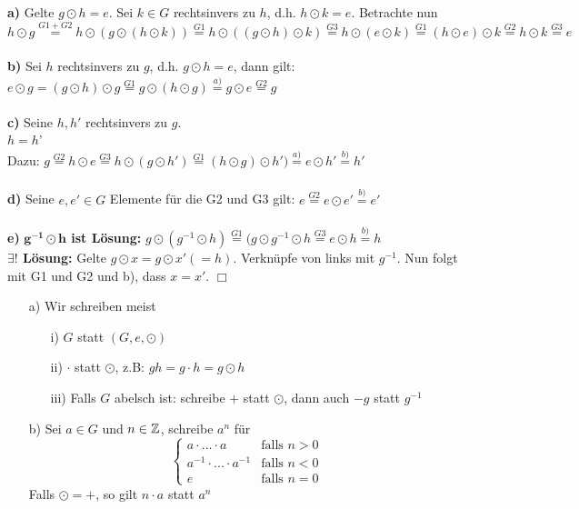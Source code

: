 \begin{bew}
	\textbf{a)} Gelte $g\odot h=e$. Sei $k\in G$ rechtsinvers zu $h$, d.h. $h\odot k=e$. Betrachte nun\\
	$h\odot g\stackrel{G1+G2}{=} h\odot(g\odot(h\odot k))\stackrel{G1}{=} h\odot((g\odot h)\odot k) \stackrel{G3}{=} h\odot(e\odot k)\stackrel{G1}{=} (h\odot e)\odot k\stackrel{G2}{=} h\odot k\stackrel{G3}{=} e$\\
	\\
	\textbf{b)} Sei $h$ rechtsinvers zu $g$, d.h. $g\odot h=e$, dann gilt: $e\odot g=(g\odot h)\odot g\stackrel{G1}{=} g\odot(h\odot g)\stackrel{a)}{=} g\odot e\stackrel{G2}{=} g$\\
	\\
	\textbf{c)} Seine $h,h'$ rechtsinvers zu $g$. \\
	\zz $h=h$'\\
	Dazu: $g\stackrel{G2}{=} h\odot e\stackrel{G3}{=} h\odot(g\odot h')\stackrel{G1}{=}(h\odot g)\odot h')\stackrel{a)}{=} e\odot h'\stackrel{b)}{=} h'$\\
	\\
	\textbf{d)} Seine $e,e'\in G$ Elemente für die G2 und G3 gilt: $e\stackrel{G2}{=} e\odot e'\stackrel{b)}{=} e'$\\
	\\
	\textbf{e)} \textbf{$\mathbf{g^{-1}\odot h}$ ist Lösung:} $g\odot (g^{-1}\odot h)\stackrel{G1}{=}(g\odot g^{-1}\odot h\stackrel{G3}{=} e\odot h\stackrel{b)}{=} h$\\
	\textbf{$\mathbf{\exists!}$ Lösung:} Gelte $g\odot x=g\odot x'(=h)$. Verknüpfe von links mit $g^{-1}$. Nun folgt mit G1 und G2 und b), dass $x=x'$. \hfill $\Box$
\end{bew}

\begin{nota}
	\begin{itemize}
		\item[]
		\item[a)] Wir schreiben meist
		\begin{itemize}
			\item[i)] $G$ statt $(G,e,\odot)$
			\item[ii)] $\cdot$ statt $\odot$, z.B: $gh=g\cdot h=g\odot h$
			\item[iii)] Falls $G$ abelsch ist: schreibe $+$ statt $\odot$, dann auch $-g$ statt $g^{-1}$
		\end{itemize}
		\item[b)] Sei $a\in G$ und $n\in\mathbb{Z}$, schreibe $a^{n}$ für
		\[
		\begin{cases}
		a\cdot...\cdot a & \text{falls }n>0\\
		a^{-1}\cdot...\cdot a^{-1} & \text{falls }n<0\\
		e & \text{falls } n=0
		\end{cases}
		\]
		Falls $\odot=+$, so gilt $n\cdot a$ statt $a^{n}$
	\end{itemize}
\end{nota}

